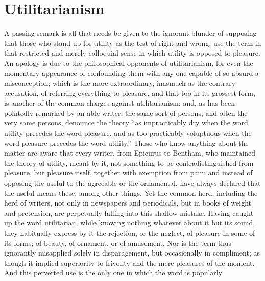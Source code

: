 
\author{John Stuart Mill}
\chapter[Utilitarianism, chap. 2]{Utilitarianism}


\noindent A passing remark is all that needs be given to the
ignorant blunder of supposing that those who stand up for utility as
the test of right and wrong, use the term in that restricted and
merely colloquial sense in which utility is opposed to pleasure. An
apology is due to the philosophical opponents of utilitarianism, for
even the momentary appearance of confounding them with any one capable
of so absurd a misconception; which is the more extraordinary,
inasmuch as the contrary accusation, of referring everything to
pleasure, and that too in its grossest form, is another of the common
charges against utilitarianism: and, as has been pointedly remarked by
an able writer, the same sort of persons, and often the very same
persons, denounce the theory ``as impracticably dry when the word
utility precedes the word pleasure, and as too practicably voluptuous
when the word pleasure precedes the word utility.'' Those who know
anything about the matter are aware that every writer, from Epicurus
to Bentham, who maintained the theory of utility, meant by it, not
something to be contradistinguished from pleasure, but pleasure
itself, together with exemption from pain; and instead of opposing the
useful to the agreeable or the ornamental, have always declared that
the useful  means these, among other things. Yet the common
herd, including the herd of writers, not only in newspapers and
periodicals, but in books of weight and pretension, are perpetually
falling into this shallow mistake. Having caught up the word
utilitarian, while knowing nothing whatever about it but its sound,
they habitually express by it the rejection, or the neglect, of
pleasure in some of its forms; of beauty, of ornament, or of
amusement. Nor is the term thus ignorantly misapplied solely in
disparagement, but occasionally in compliment; as though it implied
superiority to frivolity and the mere pleasures of the moment. And
this perverted use is the only one in which the word is popularly
